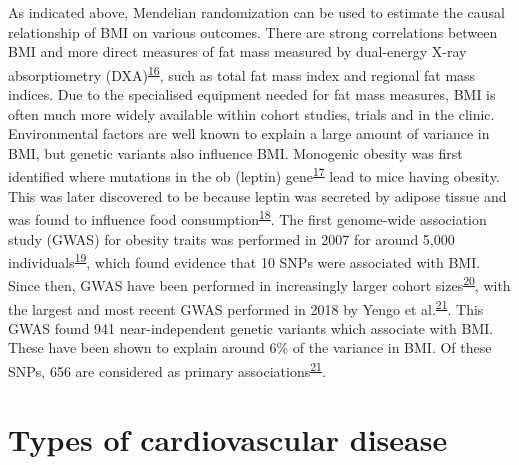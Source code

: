 \documentclass[11pt,twoside]{bristolthesis}
\begin{document}
As indicated above, Mendelian randomization can be used to estimate the causal relationship of BMI on various outcomes. There are strong correlations between BMI and more direct measures of fat mass measured by dual-energy X-ray absorptiometry (DXA)\textsuperscript{\protect\hyperlink{ref-Bell2018}{16}}, such as total fat mass index and regional fat mass indices. Due to the specialised equipment needed for fat mass measures, BMI is often much more widely available within cohort studies, trials and in the clinic. Environmental factors are well known to explain a large amount of variance in BMI, but genetic variants also influence BMI. Monogenic obesity was first identified where mutations in the ob (leptin) gene\textsuperscript{\protect\hyperlink{ref-Zhang1994}{17}} lead to mice having obesity. This was later discovered to be because leptin was secreted by adipose tissue and was found to influence food consumption\textsuperscript{\protect\hyperlink{ref-Friedman1998}{18}}. The first genome-wide association study (GWAS) for obesity traits was performed in 2007 for around 5,000 individuals\textsuperscript{\protect\hyperlink{ref-Scuteri2007}{19}}, which found evidence that 10 SNPs were associated with BMI. Since then, GWAS have been performed in increasingly larger cohort sizes\textsuperscript{\protect\hyperlink{ref-Locke2015}{20}}, with the largest and most recent GWAS performed in 2018 by Yengo et al.\textsuperscript{\protect\hyperlink{ref-Yengo2018}{21}}. This GWAS found 941 near-independent genetic variants which associate with BMI. These have been shown to explain around 6\% of the variance in BMI. Of these SNPs, 656 are considered as primary associations\textsuperscript{\protect\hyperlink{ref-Yengo2018}{21}}.

\hypertarget{types-of-cardiovascular-disease}{%
\section{Types of cardiovascular disease}\label{types-of-cardiovascular-disease}}
\end{document}
